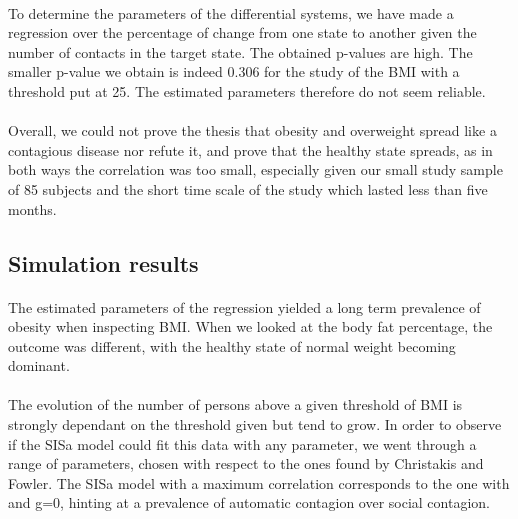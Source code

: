 \documentclass[11pt]{article}
\begin{document}
\paragraph{}
To determine the parameters of the differential systems, we have made a regression over the percentage of change from one state to another given the number of contacts in the target state. The obtained p-values are high. The smaller p-value we obtain is indeed 0.306 for the study of the BMI with a threshold put at 25. The estimated parameters therefore do not seem reliable. 

\paragraph{}

Overall, we could not prove the thesis that obesity and overweight spread like a contagious disease nor refute it, and prove that the healthy state spreads, as in both ways the correlation was too small, especially given our small study sample of 85 subjects and the short time scale of the study which lasted less than five months.

\subsection{Simulation results}
\paragraph{}
The estimated parameters of the regression yielded a long term prevalence of obesity when inspecting BMI. When we looked at the body fat percentage, the outcome was different, with the healthy state of normal weight becoming dominant.


\paragraph{}
The evolution of the number of persons above a given threshold of BMI is strongly dependant on the threshold given but tend to grow. In order to observe if the SISa model could fit this data with any parameter, we went through a range of parameters, chosen with respect to the ones found by Christakis and Fowler. The SISa model with a maximum correlation corresponds to the one with \beta{} and g=0, hinting at a prevalence of automatic contagion over social contagion. 
\end{document}
